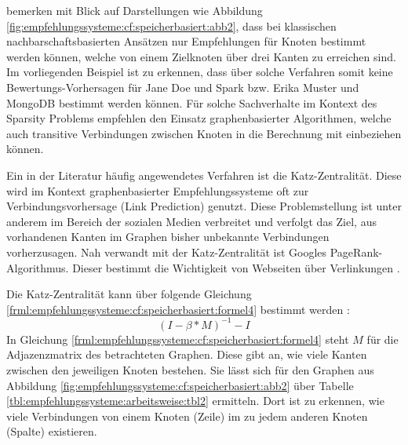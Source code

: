 \textcite[S. 7ff.]{huang:2004} bemerken mit Blick auf Darstellungen wie Abbildung \ref{fig:empfehlungssysteme:cf:speicherbasiert:abb2}, dass bei klassischen nachbarschaftsbasierten Ansätzen nur Empfehlungen für Knoten bestimmt werden können, welche von einem Zielknoten über drei Kanten zu erreichen sind. Im vorliegenden Beispiel ist zu erkennen, dass über solche Verfahren somit keine Bewertungs-Vorhersagen für Jane Doe und Spark bzw. Erika Muster und MongoDB bestimmt werden können. Für solche Sachverhalte im Kontext des Sparsity Problems empfehlen \textcite{huang:2004} den Einsatz graphenbasierter Algorithmen, welche auch transitive Verbindungen zwischen Knoten in die Berechnung mit einbeziehen können.

Ein in der Literatur häufig angewendetes Verfahren ist die Katz-Zentralität. Diese wird im Kontext graphenbasierter Empfehlungssysteme oft zur Verbindungsvorhersage (Link Prediction) genutzt. Diese Problemstellung ist unter anderem im Bereich der sozialen Medien verbreitet und verfolgt das Ziel, aus vorhandenen Kanten im Graphen bisher unbekannte Verbindungen vorherzusagen. Nah verwandt mit der Katz-Zentralität ist Googles PageRank-Algorithmus. Dieser bestimmt die Wichtigkeit von Webseiten über Verlinkungen \cite[S. 3ff.]{page:1999}.

Die Katz-Zentralität kann über folgende Gleichung \ref{frml:empfehlungssysteme:cf:speicherbasiert:formel4} bestimmt werden \cite[S. 4]{libenNowell:2007}:
\begin{equation}
	(I - \beta * M)^{-1} - I
	\label{frml:empfehlungssysteme:cf:speicherbasiert:formel4}
\end{equation}
In Gleichung \ref{frml:empfehlungssysteme:cf:speicherbasiert:formel4} steht $M$ für die Adjazenzmatrix des betrachteten Graphen. Diese gibt an, wie viele Kanten zwischen den jeweiligen Knoten bestehen. Sie lässt sich für den Graphen aus Abbildung \ref{fig:empfehlungssysteme:cf:speicherbasiert:abb2} über Tabelle \ref{tbl:empfehlungssysteme:arbeitsweise:tbl2} ermitteln. Dort ist zu erkennen, wie viele Verbindungen von einem Knoten (Zeile) im  zu jedem anderen Knoten (Spalte) existieren.

